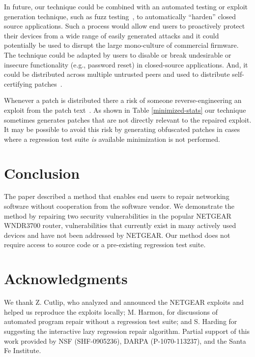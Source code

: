 \documentclass{sigcomm-alternate}
\begin{document}
In future, our technique could be combined with an automated testing or exploit
generation technique, such as fuzz testing~\cite{miller1990empirical},
to automatically ``harden'' closed source applications.  Such a
process would allow end users to proactively protect their
devices from a wide range of easily generated attacks and it could 
potentially be used to disrupt the large mono-culture of commercial firmware.
The technique could be adapted by users to disable or break
undesirable or insecure functionality (e.g., password reset) in
closed-source applications.  And, it could be distributed across
multiple untrusted peers and used to distribute self-certifying
patches~\cite{costa2008vigilante,schulte2013embedded}.


Whenever a patch is distributed there a risk of someone
reverse-engineering an exploit from the patch
text~\cite{brumley2008automatic}.  As shown in Table
\ref{minimized-stats} our technique sometimes generates patches that
are not directly relevant to the repaired exploit.  It may be possible
to avoid this risk by generating obfuscated patches in cases where a
regression test suite \emph{is} available minimization is not
performed.

\section{Conclusion}

The paper described a method that enables end users to repair networking
software without cooperation from the software vendor.  We demonstrate
the method by repairing two security vulnerabilities in the popular
NETGEAR WNDR3700 router, vulnerabilities that currently exist in many
actively used devices and have not been addressed by NETGEAR.  Our
method does not require access to source code or a pre-existing
regression test suite.

\section{Acknowledgments}
\label{sec-7}
We thank Z. Cutlip, who analyzed and announced
the NETGEAR exploits and helped us reproduce the exploits
locally;
M. Harmon, for discussions of automated program repair without a
regression test suite; and S. Harding for suggesting the
interactive lazy regression repair algorithm.  
Partial support of this work provided by NSF (SHF-0905236),
DARPA (P-1070-113237), and the Santa Fe Institute.



\end{document}
